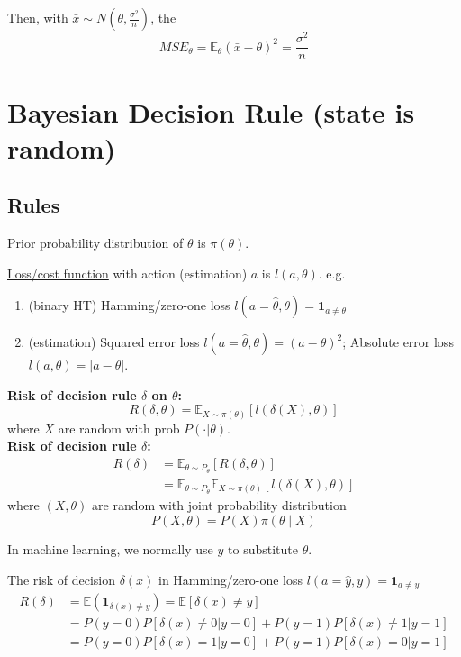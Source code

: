 \documentclass[11pt]{elegantbook}
\begin{document}
Then, with $\bar{x}\sim N(\theta,\frac{\sigma^2}{n})$, the $$MSE_\theta=\mathbb{E}_\theta\left(\bar{x}-\theta\right)^2=\frac{\sigma^2}{n}$$

\section{Bayesian Decision Rule (state is random)}
\subsection{Rules}
Prior probability distribution of $\theta$ is $\pi(\theta)$.

\underline{Loss/cost function} with action (estimation) $a$ is $l(a,\theta)$. e.g.
\begin{enumerate}
    \item (binary HT) Hamming/zero-one loss $l(a=\hat{\theta},\theta)=\mathbf{1}_{a\neq \theta}$
    \item (estimation) Squared error loss $l(a=\hat{\theta},\theta)=(a-\theta)^2$; Absolute error loss $l(a,\theta)=|a-\theta|$.
\end{enumerate}

\begin{definition}[Risk]
    \normalfont
    \textbf{Risk of decision rule $\delta$ on $\theta$:} $$R(\delta,\theta)=\mathbb{E}_{X\sim \pi(\theta)}\left[l(\delta(X),\theta)\right]$$ where $X$ are random with prob $P(\cdot|\theta)$.\\
    \textbf{Risk of decision rule $\delta$:}
        \begin{equation}
            \begin{aligned}
                R(\delta)&=\mathbb{E}_{\theta\sim P_\theta}[R(\delta,\theta)]\\
                &=\mathbb{E}_{\theta\sim P_\theta}\mathbb{E}_{X\sim \pi(\theta)}\left[l(\delta(X),\theta)\right]
            \end{aligned}
            \nonumber
        \end{equation}
        where $(X,\theta)$ are random with joint probability distribution $$P(X,\theta)=P(X)\pi(\theta\mid X)$$
\end{definition}
\begin{note}
    In machine learning, we normally use $y$ to substitute $\theta$.
\end{note}


\begin{example}
    The risk of decision $\delta(x)$ in Hamming/zero-one loss $l(a=\hat{y},y)=\mathbf{1}_{a\neq y}$
    \begin{equation}
        \begin{aligned}
            R(\delta)&=\mathbb{E}(\mathbf{1}_{\delta(x)\neq y})=\mathbb{E}[\delta(x)\neq y]\\
            &=P(y=0)P[\delta(x)\neq 0|y=0]+P(y=1)P[\delta(x)\neq 1|y=1]\\
            &=P(y=0)P[\delta(x)=1|y=0]+P(y=1)P[\delta(x)=0|y=1]
        \end{aligned}
        \nonumber
    \end{equation}
\end{example}
\end{document}
